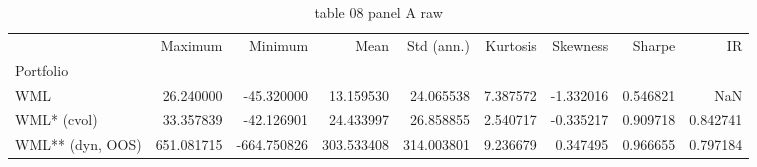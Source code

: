 \begin{table}[htbp]
  \centering
  \caption{table 08 panel A raw}
  \label{tab:table_08_panel_A_raw}
  \begin{tabular}{lrrrrrrrr}
\toprule
 & Maximum & Minimum & Mean & Std (ann.) & Kurtosis & Skewness & Sharpe & IR \\
Portfolio &  &  &  &  &  &  &  &  \\
\midrule
WML & 26.240000 & -45.320000 & 13.159530 & 24.065538 & 7.387572 & -1.332016 & 0.546821 & NaN \\
WML* (cvol) & 33.357839 & -42.126901 & 24.433997 & 26.858855 & 2.540717 & -0.335217 & 0.909718 & 0.842741 \\
WML** (dyn, OOS) & 651.081715 & -664.750826 & 303.533408 & 314.003801 & 9.236679 & 0.347495 & 0.966655 & 0.797184 \\
\bottomrule
\end{tabular}

\end{table}
